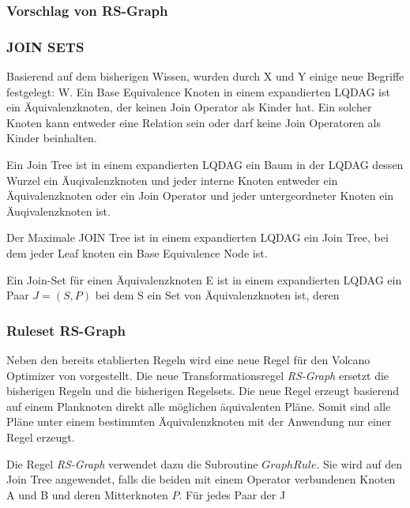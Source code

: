 \subsubsection{Vorschlag von RS-Graph}

\subsubsection{JOIN SETS}

Basierend auf dem bisherigen Wissen, wurden durch X und Y einige neue Begriffe festgelegt: W.
Ein Base Equivalence Knoten in einem expandierten LQDAG ist ein Äquivalenzknoten, der keinen Join Operator als Kinder hat. Ein solcher Knoten kann entweder eine Relation sein oder darf keine Join Operatoren als Kinder beinhalten.

Ein Join Tree ist in einem expandierten LQDAG ein Baum in der LQDAG dessen Wurzel ein Äuqivalenzknoten und jeder interne Knoten entweder ein Äquivalenzknoten oder ein Join Operator und jeder untergeordneter Knoten ein Äuqivalenzknoten ist.

Der Maximale JOIN Tree ist in einem expandierten LQDAG ein Join Tree, bei dem jeder Leaf knoten ein Base Equivalence Node ist.

Ein Join-Set für einen Äquivalenzknoten E ist in einem expandierten LQDAG ein Paar $J = (S, P)$ bei dem S ein Set von Äquivalenzknoten ist, deren 

\subsubsection{Ruleset RS-Graph}
Neben den bereits etablierten Regeln wird eine neue Regel für den Volcano Optimizer von \cite{shanbhag2014optimizing} vorgestellt. Die neue Transformationsregel \emph{RS-Graph} ersetzt die bisherigen Regeln und die bisherigen Regelsets. Die neue Regel erzeugt basierend auf einem Planknoten direkt alle möglichen äquivalenten Pläne. Somit sind alle Pläne unter einem bestimmten Äquivalenzknoten mit der Anwendung nur einer Regel erzeugt.

Die Regel \emph{RS-Graph} verwendet dazu die Subroutine $GraphRule$. Sie wird auf den Join Tree angewendet, falls die beiden mit einem Operator verbundenen Knoten A und B und deren Mitterknoten $P$. Für jedes Paar der J %

